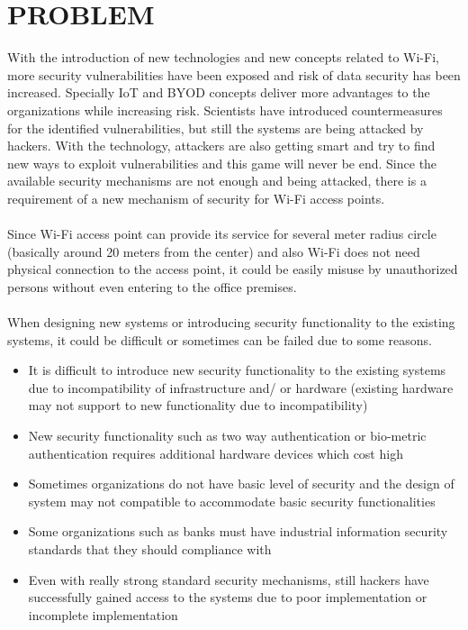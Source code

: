 \section{PROBLEM}
With the introduction of new technologies and new concepts related to Wi-Fi, more security vulnerabilities have been exposed and risk of data security has been increased. Specially IoT and BYOD concepts deliver more advantages to the organizations while increasing risk. Scientists have introduced countermeasures for the identified vulnerabilities, but still the systems are being attacked by hackers. With the technology, attackers are also getting smart and try to find new ways to exploit vulnerabilities and this game will never be end. Since the available security mechanisms are not enough and being attacked, there is a requirement of a new mechanism of security for Wi-Fi access points.

\paragraph{}
Since Wi-Fi access point can provide its service for several meter radius circle (basically around 20 meters from the center) and also Wi-Fi does not need physical connection to the access point, it could be easily misuse by unauthorized persons without even entering to the office premises.

\paragraph{}
When designing new systems or introducing security functionality to the existing systems, it could be difficult or sometimes can be failed due to some reasons.

\begin{itemize}
	\item It is difficult to introduce new security functionality to the existing systems due to incompatibility of infrastructure and/ or hardware (existing hardware may not support to new functionality due to incompatibility)
	\item New security functionality such as two way authentication or bio-metric authentication requires additional hardware devices which cost high
	\item Sometimes organizations do not have basic level of security and the design of system may not compatible to accommodate basic security functionalities	
	\item Some organizations such as banks  must have industrial information security standards that they should compliance with
	\item Even with really strong standard security mechanisms, still hackers have successfully gained access to the systems due to poor implementation or incomplete implementation	
\end{itemize}

